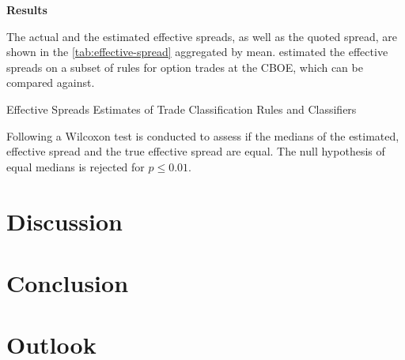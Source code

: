 \textbf{Results}

The actual and the estimated effective spreads, as well as the quoted spread, are shown in the \cref{tab:effective-spread} aggregated by mean. \textcite[][896--897]{savickasInferringDirectionOption2003} estimated the effective spreads on a subset of rules for option trades at the \gls{CBOE}, which can be compared against.

\begin{table}[H]
    \centering
    
    \caption{Effective Spreads Estimates of Trade Classification Rules and Classifiers}
    \label{tab:effective-spread}
\end{table}

Following \textcite[][12]{theissenTestAccuracyLee2000} a Wilcoxon test is conducted to assess if the medians of the estimated, effective spread and the true effective spread are equal. The null hypothesis of equal medians is rejected for $p \leq 0.01$.



\newpage
\section{Discussion}\label{sec:discussion}

\newpage
\section{Conclusion}\label{sec:conclusion}

\newpage
\section{Outlook}\label{sec:outlook}

